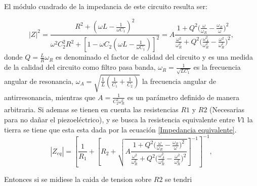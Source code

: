 \documentclass{article}
\begin{document}
El módulo cuadrado de la impedancia de este circuito resulta ser:

\begin{equation} \left|Z\right|^2=\frac{R^2+\left(\omega L -\frac{1}{\omega
    C_1}\right)^2}{\omega^2C_2^2R^2+\left[1-\omega C_2\left(\omega
    L-\frac{1}{\omega C_1}\right)\right]^2}= A \frac {1 + Q^2
    \bigg(\frac{\omega}{\omega_R} - \frac{\omega_R}{\omega}\bigg)^2}
{\frac{\omega^2}{\omega^2_R} + Q^2\bigg(\frac{\omega^2_A}{\omega^2_R} -
\frac{\omega^2}{\omega^2_R}\bigg)^2}\mathrm{,} \label{Impedancia piezoelectrico}
\end{equation}
donde $Q = \frac{L}{R}\omega_R$ es denominado el factor de calidad del circuito
y es una medida de la calidad del circuito como filtro pasa banda, $\omega_R =
\frac{1}{\sqrt{LC_1}}$ es la frecuencia angular de resonancia, $\omega_A =
\sqrt{\frac{1}{L}(\frac{1}{C_1} + \frac{1}{C_2})}$ la frecuencia angular de
antirresonancia, mientras que $A = \frac{1}{C^2_2\omega^2_R}$ es un parámetro
definido de manera arbitraria.
Si ademas se tienen en cuenta las resistencias $R1$ y $R2$ (Necesarias para
no dañar el piezoeléctrico), y se busca la resistencia equivalente entre $V1$ 
la tierra se tiene que esta esta dada por la ecuación \ref{Impedancia
equivalente}.
\begin{equation} \label{Impedancia equivalente}
    \left|Z_{eq}\right| = \left[\frac{1}{R_1} + \left[R_2 + \sqrt{A \frac {1 +
    Q^2 \bigg(\frac{\omega}{\omega_R} - \frac{\omega_R}{\omega}\bigg)^2}
    {\frac{\omega^2}{\omega^2_R} + Q^2\bigg(\frac{\omega^2_A}{\omega^2_R} -
    \frac{\omega^2}{\omega^2_R}\bigg)^2}}\right]^{-1}\right]^{-1}\mathrm{,}
\end{equation}                

Entonces si se midiese la caida de tension sobre $R2$ se tendri



\end{document}

